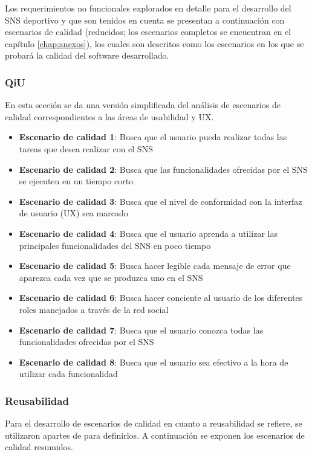 Los requerimientos no funcionales explorados en detalle para el desarrollo del SNS deportivo y que son tenidos en cuenta se presentan a continuación con escenarios de calidad (reducidos; los escenarios completos se encuentran en el capítulo \ref{chap:anexos}), los cuales son descritos como los escenarios en los que se probará la calidad del software desarrollado.

\subsubsection{QiU}

En esta sección se da una versión simplificada del análisis de escenarios de calidad correspondientes a las áreas de usabilidad y UX.

\begin{itemize}
	\item \textbf{Escenario de calidad 1}: Busca que el usuario pueda realizar todas las tareas que desea realizar con el SNS
	\item \textbf{Escenario de calidad 2}: Busca que las funcionalidades ofrecidas por el SNS se ejecuten en un tiempo corto
	\item \textbf{Escenario de calidad 3}: Busca que el nivel de conformidad con la interfaz de usuario (UX) sea marcado
	\item \textbf{Escenario de calidad 4}: Busca que el usuario aprenda a utilizar las principales funcionalidades del SNS en poco tiempo
	\item \textbf{Escenario de calidad 5}: Busca hacer legible cada mensaje de error que aparezca cada vez que se produzca uno en el SNS
	\item \textbf{Escenario de calidad 6}: Busca hacer conciente al usuario de los diferentes roles manejados a través de la red social
	\item \textbf{Escenario de calidad 7}: Busca que el usuario conozca todas las funcionalidades ofrecidas por el SNS
	\item \textbf{Escenario de calidad 8}: Busca que el usuario sea efectivo a la hora de utilizar cada funcionalidad
\end{itemize}

\subsubsection{Reusabilidad}

Para el desarrollo de escenarios de calidad en cuanto a reusabilidad se refiere, se utilizaron apartes de \cite{soa_principles} para definirlos. A continuación se exponen los escenarios de calidad resumidos.

